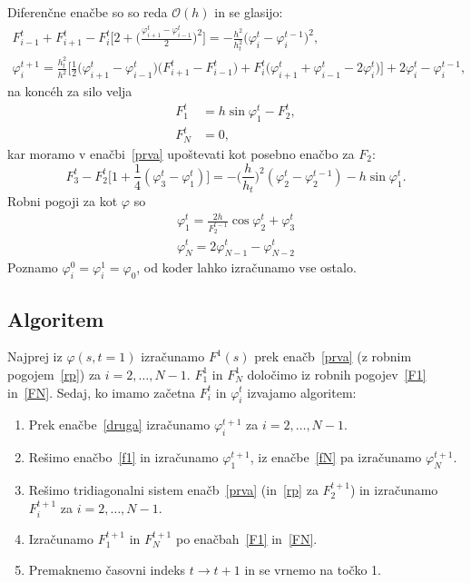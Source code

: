 \documentclass[a4 paper, 12pt]{article}
\newcommand{\vfi}{
    \ensuremath{\varphi}
}
\begin{document}
Diferen\v cne ena\v cbe so so reda $\mathcal{O}(h)$ in se glasijo:
\begin{align}
    F^t_{i-1} + F^t_{i+1} - F^t_i\Bigg[2 + \bigg(\frac{\vfi^t_{i+1} - \vfi^t_{i-1}}{2}\bigg)^2\Bigg] =
        -\frac{h^2}{h_t^2}\big(\vfi^t_i - \vfi^{t-1}_i\big)^2,
        \label{prva} \\
    \vfi^{t+1}_i = \frac{h_t^2}{h^2}\Bigg[\frac{1}{2}\big(\vfi^t_{i+1} - \vfi^t_{i-1}\big)
        \big(F^t_{i+1} - F^t_{i-1}\big) + F^t_i\big(\vfi^t_{i+1} + \vfi^t_{i-1} - 2\vfi^t_i\big)\Bigg] +
        2\vfi^t_i - \vfi^{t-1}_i,
        \label{druga}
\end{align}
na koncéh za silo velja
\begin{align}
    F^t_1 &= h\sin\vfi_1^t - F^t_2, 
    \label{F1} \\
    F^t_N &= 0,
    \label{FN}
\end{align}
kar moramo v ena\v cbi~\eqref{prva} upo\v stevati kot posebno ena\v cbo za $F_2$:
\begin{equation}
    F^t_3 - F_2^t\Big[1 + \textstyle{\frac{1}{4}}(\vfi^t_3 - \vfi^t_1)\Big] = -\big(\textstyle{\frac{h}{h_t}}\big)^2
        (\vfi_2^t - \vfi_2^{t-1}) - h\sin\vfi^t_1.
    \label{rp}
\end{equation}
Robni pogoji za kot $\vfi$ so
\begin{align}
    \vfi_1^t = \frac{2h}{F^{t-1}_2}\cos\vfi^t_2 + \vfi^t_3
    \label{f1} \\
    \vfi_N^t = 2\vfi^t_{N-1} - \vfi^t_{N-2}
    \label{fN}
\end{align}
Poznamo $\vfi^0_i = \vfi^1_i = \vfi_0$, od koder lahko izra\v cunamo vse ostalo.

\subsection{Algoritem}

Najprej iz $\vfi (s, t=1)$ izra\v cunamo $F^1 (s)$ prek ena\v cb~\eqref{prva} (z robnim pogojem~\eqref{rp}) za
$i = 2,\ldots,N-1$. $F^1_1$ in $F^1_N$ dolo\v cimo iz robnih pogojev~\eqref{F1} in~\eqref{FN}. Sedaj, ko imamo
za\v cetna $F^t_i$ in $\vfi^t_i$ izvajamo algoritem:
\begin{enumerate}
    \item{Prek ena\v cbe~\eqref{druga} izra\v cunamo $\vfi^{t+1}_i$ za $i = 2,\ldots,N-1$.}
    \item{Re\v simo ena\v cbo~\eqref{f1} in izra\v cunamo $\vfi^{t+1}_1$, iz ena\v cbe~\eqref{fN} pa
        izra\v cunamo $\vfi^{t+1}_N$.}
    \item{Re\v simo tridiagonalni sistem ena\v cb~\eqref{prva} (in~\eqref{rp} za $F^{t+1}_2$) in
        izra\v cunamo $F^{t+1}_i$ za $i = 2,\ldots,N-1$.}
    \item{Izra\v cunamo $F^{t+1}_1$ in $F^{t+1}_N$ po ena\v cbah~\eqref{F1} in~\eqref{FN}.}
    \item{Premaknemo \v casovni indeks $t \to t+1$ in se vrnemo na to\v cko 1.}
\end{enumerate}
\end{document}
